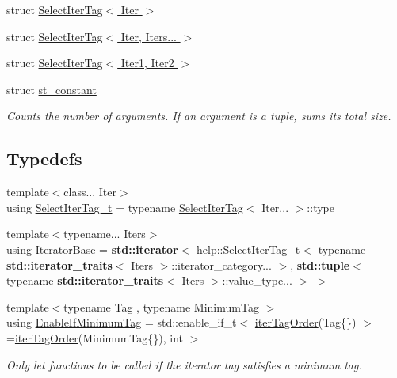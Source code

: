 \begin{DoxyCompactItemize}
struct \hyperlink{structit_1_1help_1_1SelectIterTag_3_01Iter_01_4}{Select\+Iter\+Tag$<$ Iter $>$}
\item 
struct \hyperlink{structit_1_1help_1_1SelectIterTag_3_01Iter_00_01Iters_8_8_8_01_4}{Select\+Iter\+Tag$<$ Iter, Iters... $>$}
\item 
struct \hyperlink{structit_1_1help_1_1SelectIterTag_3_01Iter1_00_01Iter2_01_4}{Select\+Iter\+Tag$<$ Iter1, Iter2 $>$}
\item 
struct \hyperlink{structit_1_1help_1_1st__constant}{st\+\_\+constant}
\begin{DoxyCompactList}\small\item\em Counts the number of arguments. If an argument is a tuple, sums its total size. \end{DoxyCompactList}\end{DoxyCompactItemize}
\subsection*{Typedefs}
\begin{DoxyCompactItemize}
\item 
{\footnotesize template$<$class... Iter$>$ }\\using \hyperlink{namespaceit_1_1help_a9dcda939d491265c5a917329449ff2af}{Select\+Iter\+Tag\+\_\+t} = typename \hyperlink{structit_1_1help_1_1SelectIterTag}{Select\+Iter\+Tag}$<$ Iter... $>$\+::type
\item 
{\footnotesize template$<$typename... Iters$>$ }\\using \hyperlink{namespaceit_1_1help_a3d72c14eeb8c9d60c70f79b551c578fe}{Iterator\+Base} = {\bf std\+::iterator}$<$ \hyperlink{namespaceit_1_1help_a9dcda939d491265c5a917329449ff2af}{help\+::\+Select\+Iter\+Tag\+\_\+t}$<$ typename {\bf std\+::iterator\+\_\+traits}$<$ Iters $>$\+::iterator\+\_\+category... $>$, {\bf std\+::tuple}$<$ typename {\bf std\+::iterator\+\_\+traits}$<$ Iters $>$\+::value\+\_\+type... $>$ $>$
\item 
{\footnotesize template$<$typename Tag , typename Minimum\+Tag $>$ }\\using \hyperlink{namespaceit_1_1help_a4f5a2a2ccba17fd27922b388ffaed363}{Enable\+If\+Minimum\+Tag} = std\+::enable\+\_\+if\+\_\+t$<$ \hyperlink{namespaceit_1_1help_ad5efd6f9a3703da509d0853b95b515db}{iter\+Tag\+Order}(Tag\{\}) $>$=\hyperlink{namespaceit_1_1help_ad5efd6f9a3703da509d0853b95b515db}{iter\+Tag\+Order}(Minimum\+Tag\{\}), int $>$
\begin{DoxyCompactList}\small\item\em Only let functions to be called if the iterator tag satisfies a minimum tag. \end{DoxyCompactList}\end{DoxyCompactItemize}
